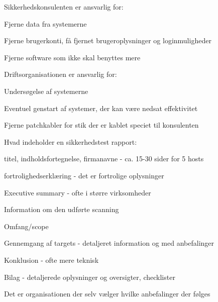 \documentclass[20pt,landscape,a4paper,footrule]{foils}
\begin{document}

\begin{list1}
\item Sikkerhedskonsulenten er ansvarlig for:
\begin{list2}
\item Fjerne data fra systemerne
\item Fjerne brugerkonti, få fjernet brugeroplysninger og
  loginmuligheder
\item Fjerne software som ikke skal benyttes mere    
\end{list2}
\item Driftsorganisationen er ansvarlig for:
\begin{list2}
\item Undersøgelse af systemerne
\item Eventuel genstart af systemer, der kan være nedsat effektivitet
\item Fjerne patchkabler for stik der er kablet speciet til konsulenten
\end{list2}
\end{list1}


\begin{list1}
\item Hvad indeholder en sikkerhedstest rapport:  
\begin{list2}
\item titel, indholdsfortegnelse, firmanavne - ca. 15-30 sider for 5 hosts    
\item fortrolighedserklæring - det er fortrolige oplysninger
\item Executive summary - ofte i større virksomheder   
\item Information om den udførte scanning
\item Omfang/scope
\item Gennemgang af targets - detaljeret information og med anbefalinger
\item Konklusion - ofte mere teknisk
\item Bilag - detaljerede oplysninger og oversigter, checklister
\end{list2}
\item Det er organisationen der selv vælger hvilke anbefalinger der følges
\end{list1}


\end{document}
